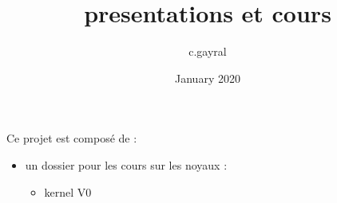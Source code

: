 \documentclass{article}
\title{presentations et cours}
\author{c.gayral }
\date{January 2020}
\begin{document}
\maketitle

Ce projet est composé de : 
\begin{itemize}
    \item un dossier pour les cours sur les noyaux : 
    \begin{itemize}
        \item kernel V0
    \end{itemize}
\end{itemize}
\end{document}
